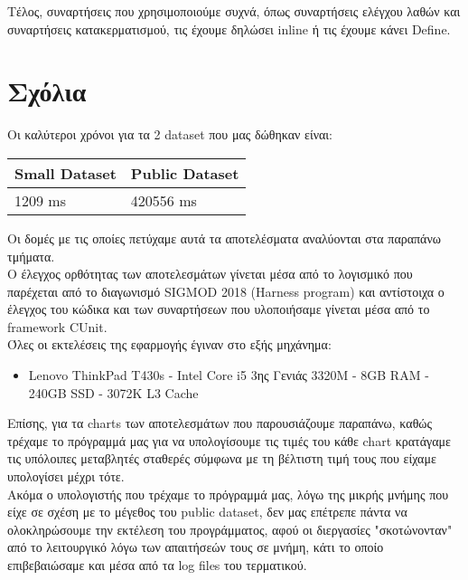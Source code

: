 \documentclass[12pt, a4paper]{article}
\begin{document}
Τέλος, συναρτήσεις που χρησιμοποιούμε συχνά, όπως συναρτήσεις ελέγχου λαθών και συναρτήσεις κατακερματισμού, τις έχουμε δηλώσει inline ή τις έχουμε κάνει Define.\\

\section{Σχόλια}

Οι καλύτεροι χρόνοι για τα 2 dataset που μας δώθηκαν είναι:

\begin{table}[hbt!]
\centering
\begin{tabular}{|l|l|}
\hline
\multicolumn{1}{|c|}{\textbf{Small Dataset}} & \textbf{Public Dataset} \\ \hline
1209 ms                                    & 420556 ms               \\ \hline
\end{tabular}
\end{table}

Οι δομές με τις οποίες πετύχαμε αυτά τα αποτελέσματα αναλύονται στα παραπάνω τμήματα.\\


Ο έλεγχος ορθότητας των αποτελεσμάτων γίνεται μέσα από το λογισμικό που παρέχεται από το διαγωνισμό SIGMOD 2018 (Harness program) και αντίστοιχα ο έλεγχος του κώδικα και των συναρτήσεων που υλοποιήσαμε γίνεται μέσα από το framework CUnit. \\

Όλες οι εκτελέσεις της εφαρμογής έγιναν στο εξής μηχάνημα:

\begin{itemize}
\item Lenovo ThinkPad T430s - Intel Core i5 3ης Γενιάς 3320M - 8GB RAM - 240GB SSD - 3072K L3 Cache
\end{itemize}

Επίσης, για τα charts των αποτελεσμάτων που παρουσιάζουμε παραπάνω, καθώς τρέχαμε το πρόγραμμά μας για να υπολογίσουμε τις τιμές του κάθε chart κρατάγαμε τις υπόλοιπες μεταβλητές σταθερές σύμφωνα με τη βέλτιστη τιμή τους που είχαμε υπολογίσει μέχρι τότε.\\

Ακόμα ο υπολογιστής που τρέχαμε το πρόγραμμά μας, λόγω της μικρής μνήμης που είχε σε σχέση με το μέγεθος του public dataset, δεν μας επέτρεπε πάντα να ολοκληρώσουμε την εκτέλεση του προγράμματος, αφού οι διεργασίες "σκοτώνονταν" από το λειτουργικό λόγω των απαιτήσεών τους σε μνήμη, κάτι το οποίο επιβεβαιώσαμε και μέσα από τα log files του τερματικού.\\
\end{document}
